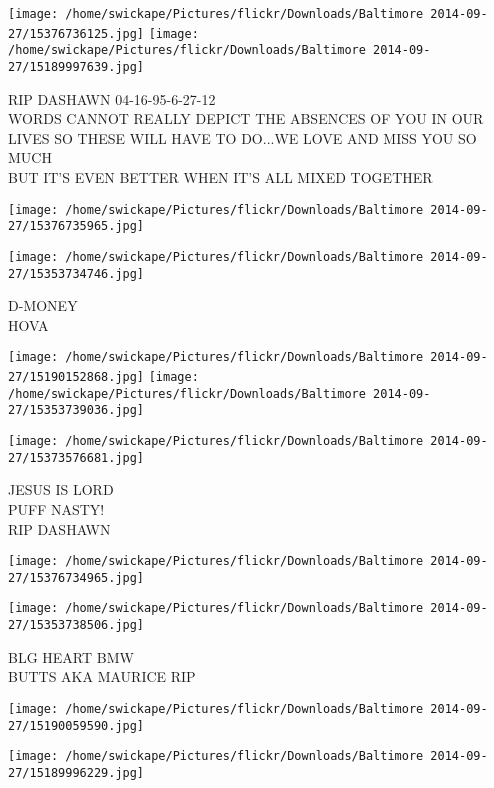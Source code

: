\documentclass[10pt,letterpaper]{article}
\begin{document}
\vspace{0.25in}
\texttt{[image: /home/swickape/Pictures/flickr/Downloads/Baltimore 2014-09-27/15376736125.jpg]}
\texttt{[image: /home/swickape/Pictures/flickr/Downloads/Baltimore 2014-09-27/15189997639.jpg]}

RIP DASHAWN 04{-}16{-}95{-}6{-}27{-}12\\
WORDS CANNOT REALLY DEPICT THE ABSENCES OF YOU IN OUR LIVES SO THESE WILL HAVE TO DO...WE LOVE AND MISS YOU SO MUCH\\
BUT IT'S EVEN BETTER WHEN IT'S ALL MIXED TOGETHER
\pagebreak

\texttt{[image: /home/swickape/Pictures/flickr/Downloads/Baltimore 2014-09-27/15376735965.jpg]}

\vspace{0.25in}
\texttt{[image: /home/swickape/Pictures/flickr/Downloads/Baltimore 2014-09-27/15353734746.jpg]}

D{-}MONEY\\
HOVA
\pagebreak

\texttt{[image: /home/swickape/Pictures/flickr/Downloads/Baltimore 2014-09-27/15190152868.jpg]}
\texttt{[image: /home/swickape/Pictures/flickr/Downloads/Baltimore 2014-09-27/15353739036.jpg]}

\vspace{0.25in}
\texttt{[image: /home/swickape/Pictures/flickr/Downloads/Baltimore 2014-09-27/15373576681.jpg]}

JESUS IS LORD\\
PUFF NASTY!\\
RIP DASHAWN
\pagebreak

\texttt{[image: /home/swickape/Pictures/flickr/Downloads/Baltimore 2014-09-27/15376734965.jpg]}

\vspace{0.25in}
\texttt{[image: /home/swickape/Pictures/flickr/Downloads/Baltimore 2014-09-27/15353738506.jpg]}

BLG HEART BMW\\
BUTTS AKA MAURICE RIP
\pagebreak

\texttt{[image: /home/swickape/Pictures/flickr/Downloads/Baltimore 2014-09-27/15190059590.jpg]}

\vspace{0.25in}
\texttt{[image: /home/swickape/Pictures/flickr/Downloads/Baltimore 2014-09-27/15189996229.jpg]}
\end{document}
